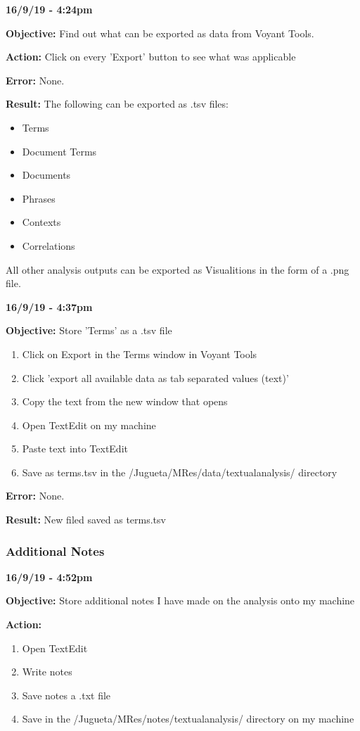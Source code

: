 \documentclass{article}
\begin{document}
\textbf{16/9/19 - 4:24pm}

\textbf{Objective:} Find out what can be exported as data from Voyant Tools.

\textbf{Action:} Click on every 'Export' button to see what was applicable

\textbf{Error:} None.

\textbf{Result:} The following can be exported as .tsv files:
\begin{itemize}
    \item Terms
    \item Document Terms
    \item Documents
    \item Phrases
    \item Contexts
    \item Correlations
\end{itemize}

All other analysis outputs can be exported as Visualitions in the form of a .png file.

\textbf{16/9/19 - 4:37pm}

\textbf{Objective:} Store 'Terms' as a .tsv file
\begin{enumerate}
    \item Click on Export in the Terms window in Voyant Tools
    \item Click 'export all available data as tab separated values (text)'
    \item Copy the text from the new window that opens
    \item Open TextEdit on my machine
    \item Paste text into TextEdit
    \item Save as terms.tsv in the /Jugueta/MRes/data/textualanalysis/ directory
\end{enumerate}

\textbf{Error:} None.

\textbf{Result:} New filed saved as terms.tsv

\subsubsection{Additional Notes}

\textbf{16/9/19 - 4:52pm}

\textbf{Objective:} Store additional notes I have made on the analysis onto my machine

\textbf{Action:}
\begin{enumerate}
    \item Open TextEdit
    \item Write notes
    \item Save notes a .txt file
    \item Save in the /Jugueta/MRes/notes/textualanalysis/ directory on my machine
\end{enumerate}
\end{document}
